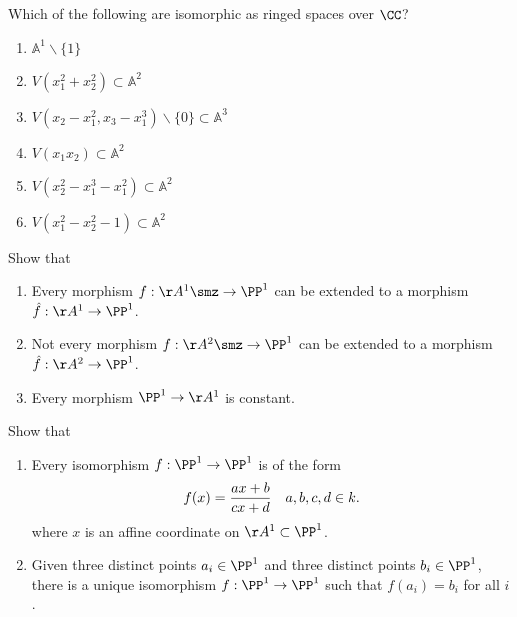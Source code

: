 \begin{problem}[Gathmann 4.19]

Which of the following are isomorphic as ringed spaces over \(\CC\)?

\begin{enumerate}
\def\labelenumi{(\alph{enumi})}
\item
  \(\mathbb{A}^{1} \backslash\{1\}\)
\item
  \(V\left(x_{1}^{2}+x_{2}^{2}\right) \subset \mathbb{A}^{2}\)
\item
  \(V\left(x_{2}-x_{1}^{2}, x_{3}-x_{1}^{3}\right) \backslash\{0\} \subset \mathbb{A}^{3}\)
\item
  \(V\left(x_{1} x_{2}\right) \subset \mathbb{A}^{2}\)
\item
  \(V\left(x_{2}^{2}-x_{1}^{3}-x_{1}^{2}\right) \subset \mathbb{A}^{2}\)
\item
  \(V\left(x_{1}^{2}-x_{2}^{2}-1\right) \subset \mathbb{A}^{2}\)
\end{enumerate}

\end{problem}

\begin{problem}[Gathmann 5.7]

Show that

\begin{enumerate}
\def\labelenumi{\alph{enumi}.}
\item
  Every morphism \(f:\AA^1\smz \to \PP^1\) can be extended to a morphism
  \(\hat f: \AA^1 \to \PP^1\).
\item
  Not every morphism \(f:\AA^2\smz \to \PP^1\) can be extended to a
  morphism \(\hat f: \AA^2 \to \PP^1\).
\item
  Every morphism \(\PP^1\to \AA^1\) is constant.
\end{enumerate}

\end{problem}

\begin{problem}[Gathmann 5.8]

Show that

\begin{enumerate}
\def\labelenumi{\alph{enumi}.}
\item
  Every isomorphism \(f:\PP^1\to \PP^1\) is of the form
  \begin{align*}  
  f(x) = {ax+b \over cx+d} && a,b,c,d\in k
  .\end{align*} where \(x\) is an affine coordinate on
  \(\AA^1\subset \PP^1\).
\item
  Given three distinct points \(a_i \in \PP^1\) and three distinct
  points \(b_i \in \PP^1\), there is a unique isomorphism
  \(f:\PP^1 \to \PP^1\) such that \(f(a_i) = b_i\) for all \(i\).
\end{enumerate}

\end{problem}

